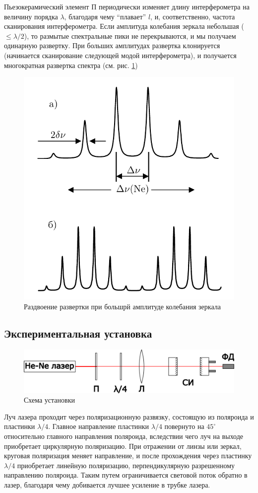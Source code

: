 \documentclass{article}
\begin{document}
Пьезокерамический элемент П периодически изменяет длину интерферометра на величину
порядка $\lambda$, благодаря чему ``плавает'' $l$, и, соответственно, частота сканирования
интерферометра. Если амплитуда колебания зеркала небольшая ($\leq \lambda/2$), то
размытые спектральные пики не перекрываются, и мы получаем одинарную развертку. При
больших амплитудах развертка клонируется (начинается сканирование следующей модой
интерферометра), и получается многократная развертка спектра
(см. рис. \ref{fig:clone_spectrum})

\begin{figure}[h]
    \center\includegraphics[width = 0.6\linewidth]{clone_spectrum.png}
    \caption{Раздвоение развертки при большрй амплитуде колебания зеркала}\label{fig:clone_spectrum}
\end{figure}

\newpage
\subsection{Экспериментальная установка}
\begin{figure}[h]
    \center\includegraphics[width=0.9\linewidth]{ustanovka.png}
    \caption{Схема установки}\label{fig:ustanovka}
\end{figure}

Луч лазера проходит через поляризационную развязку, состоящую из поляроида и пластинки
$\lambda/4$. Главное направление пластинки $\lambda/4$ повернуто на $45^\circ$
относительно главного направления поляроида, вследствии чего луч на выходе приобретает
циркулярную поляризацию. При отражении от линзы или зеркал, круговая поляризация
меняет направление, и после прохождения через пластинку $\lambda/4$ приобретает
линейную поляризацию, перпендикулярную разрешенному направлению поляроида. Таким
путем ограничивается световой поток обратно в лазер, благодаря чему добивается лучшее
усиление в трубке лазера.
\end{document}
